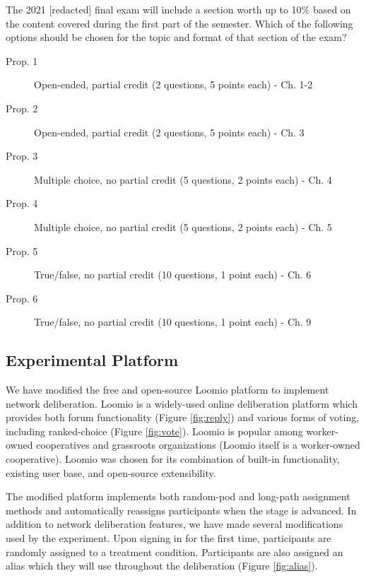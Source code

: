 \begin{displayquote}

The 2021 [redacted] final exam will include a section worth up to 10\% based on the content covered during the first part of the semester. Which of the following options should be chosen for the topic and format of that section of the exam?

\begin{description}
\item[Prop. 1]{Open-ended, partial credit (2 questions, 5 points each) - Ch. 1-2}
\item[Prop. 2]{Open-ended, partial credit (2 questions, 5 points each) - Ch. 3}
\item[Prop. 3]{Multiple choice, no partial credit (5 questions, 2 points each) - Ch. 4}
\item[Prop. 4]{Multiple choice, no partial credit (5 questions, 2 points each) - Ch. 5}
\item[Prop. 5]{True/false, no partial credit (10 questions, 1 point each) - Ch. 6}
\item[Prop. 6]{True/false, no partial credit (10 questions, 1 point each) - Ch. 9}
\end{description}
\end{displayquote}


\subsection{Experimental Platform}
\label{sec:exp-platform}

We have modified the free and open-source Loomio platform \cite{jackson_open_2016} to implement network deliberation.
Loomio is a widely-used online deliberation platform which provides both forum functionality (Figure \ref{fig:reply}) and various forms of voting, including ranked-choice (Figure \ref{fig:vote}).
Loomio is popular among worker-owned cooperatives and grassroots organizations (Loomio itself is a worker-owned cooperative).
Loomio was chosen for its combination of built-in functionality, existing user base, and open-source extensibility.

The modified platform implements both random-pod and long-path assignment methods and automatically reassigns participants when the stage is advanced.
In addition to network deliberation features, we have made several modifications used by the experiment.
Upon signing in for the first time, participants are randomly assigned to a treatment condition.
Participants are also assigned an alias which they will use throughout the deliberation (Figure \ref{fig:alias}).

